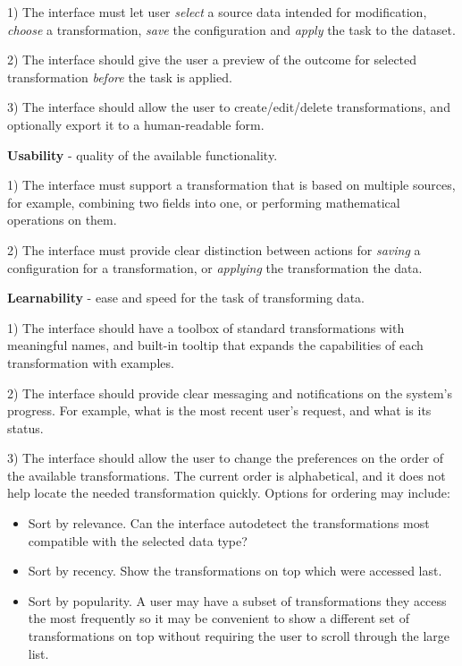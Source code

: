 \documentclass[12pt,letterpaper]{article}
\begin{document}
1) The interface must let user \textit{select} a source data intended for modification, \textit{choose} a transformation, \textit{save} the configuration and \textit{apply} the task to the dataset.

2) The interface should give the user a preview of the outcome for selected transformation \textit{before} the task is applied.

3) The interface should allow the user to create/edit/delete transformations, and optionally export it to a human-readable form.

\textbf{Usability} - quality of the available functionality.

1) The interface must support a transformation that is based on multiple sources, for example, combining two fields into one, or performing mathematical operations on them.

2) The interface must provide clear distinction between actions for \textit{saving} a configuration for a transformation, or \textit{applying} the transformation the data.

\textbf{Learnability} - ease and speed for the task of transforming data.

1) The interface should have a toolbox of standard transformations with meaningful names, and built-in tooltip that expands the capabilities of each transformation with examples.

2) The interface should provide clear messaging and notifications on the system's progress. For example, what is the most recent user's request, and what is its status.

3) The interface should allow the user to change the preferences on the order of the available transformations. The current order is alphabetical, and it does not help locate the needed transformation quickly. Options for ordering may include: 

\begin{itemize}
    \item Sort by relevance. Can the interface autodetect the transformations most compatible with the selected data type?
    \item Sort by recency. Show the transformations on top which were accessed last.
    \item Sort by popularity. A user may have a subset of transformations they access the most frequently so it may be convenient to show a different set of transformations on top without requiring the user to scroll through the large list. 
\end{itemize}
\end{document}
